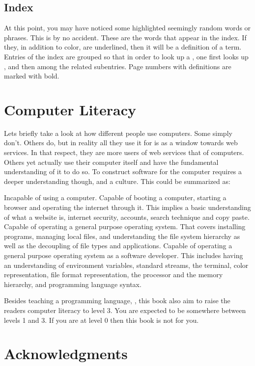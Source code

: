 \subsection{Index}

At this point, you may have noticed some highlighted seemingly random words or phrases. This is by no accident. These are the words that appear in the index. If they, in addition to color, are underlined, then it will be a definition of a term. Entries of the index are grouped so that in order to look up a , one first looks up , and then  among the related subentries. Page numbers with definitions are marked with bold.

\section{Computer Literacy}

Lets briefly take a look at how different people use computers. Some simply don't. Others do, but in reality all they use it for is as a window towards web services. In that respect, they are more users of web services that of computers. Others yet actually use their computer itself and have the fundamental understanding of it to do so. To construct software for the computer requires a deeper understanding though, and a culture. This could be summarized as:

\begin{itemize}
   Incapable of using a computer.
   Capable of booting a computer, starting a browser and operating the internet through it. This implies a basic understanding of what a website is, internet security, accounts, search technique and copy paste.
   Capable of operating a general purpose operating system. That covers installing programs, managing local files, and understanding the file system hierarchy as well as the decoupling of file types and applications.
   Capable of operating a general purpose operating system as a software developer. This includes having an understanding of environment variables, standard streams, the terminal, color representation, file format representation, the processor and the memory hierarchy, and programming language syntax.
\end{itemize}

Besides teaching a programming language, \csharp, this book also aim to raise the readers computer literacy to level 3. You are expected to be somewhere between levels 1 and 3. If you are at level 0 then this book is not for you.

\section{Acknowledgments}
